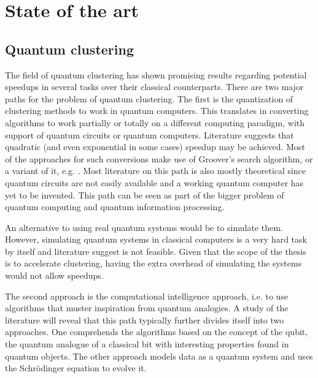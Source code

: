 
\chapter{State of the art}
\label{chapter:stateofart}



\section{Quantum clustering}
The field of quantum clustering has shown promising results regarding potential speedups in several tasks over their classical counterparts. 
There are two major paths for the problem of quantum clustering. The first is the quantization of clustering methods to work in quantum computers. This translates in converting algorithms to work partially or totally on a different computing paradigm, with support of quantum circuits or quantum computers. Literature suggests that quadratic (and even exponential in some cases) speedup may be achieved. Most of the approaches for such conversions make use of Groover's search algorithm, or a variant of it, e.g. \citet{Wiebe2014}. Most literature on this path is also mostly theoretical since quantum circuits are not easily available and a working quantum computer has yet to be invented. This path can be seen as part of the bigger problem of quantum computing and quantum information processing.


An alternative to using real quantum systems would be to simulate them. However, simulating quantum systems in classical computers is a very hard task by itself and literature suggest is not feasible. Given that the scope of the thesis is to accelerate clustering, having the extra overhead of simulating the systems would not allow speedups.

The second approach is the computational intelligence approach, i.e.  to use algorithms that muster inspiration from quantum analogies. A study of the literature will reveal that this path typically further divides itself into two approaches. One comprehends the algorithms based on the concept of the qubit, the quantum analogue of a classical bit with interesting properties found in quantum objects. The other approach models data as a quantum system and uses the Schrödinger equation to evolve it.

